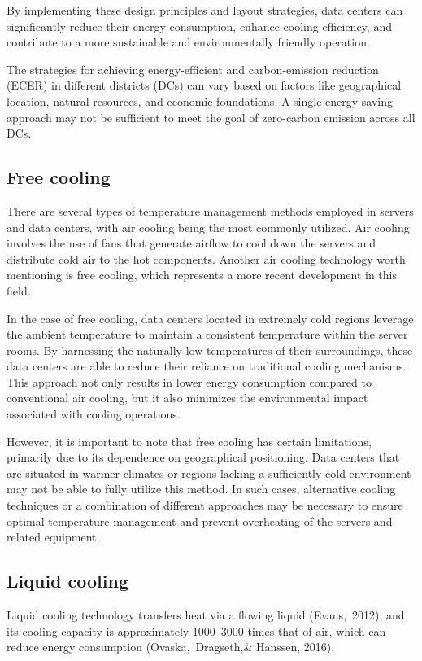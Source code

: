 \documentclass[
  a4paper,  %
  twoside,  %
  bibliography=totoc,
  headsepline,
  cleardoublepage=empty,
  parskip=half,
  draft=false
]{scrbook}
\begin{document}
By implementing these design principles and layout strategies, data centers can significantly reduce their energy consumption, enhance cooling efficiency, and contribute to a more sustainable and environmentally friendly operation.

The strategies for achieving energy-efficient and carbon-emission reduction (ECER) in different districts (DCs) can vary based on factors like geographical location, natural resources, and economic foundations. A single energy-saving approach may not be sufficient to meet the goal of zero-carbon emission across all DCs.


\subsection{Free cooling}
There are several types of temperature management methods employed in servers and data centers, with air cooling being the most commonly utilized. Air cooling involves the use of fans that generate airflow to cool down the servers and distribute cold air to the hot components. Another air cooling technology worth mentioning is free cooling, which represents a more recent development in this field.

In the case of free cooling, data centers located in extremely cold regions leverage the ambient temperature to maintain a consistent temperature within the server rooms. By harnessing the naturally low temperatures of their surroundings, these data centers are able to reduce their reliance on traditional cooling mechanisms. This approach not only results in lower energy consumption compared to conventional air cooling, but it also minimizes the environmental impact associated with cooling operations.

However, it is important to note that free cooling has certain limitations, primarily due to its dependence on geographical positioning. Data centers that are situated in warmer climates or regions lacking a sufficiently cold environment may not be able to fully utilize this method. In such cases, alternative cooling techniques or a combination of different approaches may be necessary to ensure optimal temperature management and prevent overheating of the servers and related equipment.

\subsection{Liquid cooling}

Liquid cooling technology transfers heat via a flowing liquid (Evans, 2012), and its cooling capacity is approximately 1000–3000 times that of air, which can reduce energy consumption (Ovaska, Dragseth,\& Hanssen, 2016).
\end{document}
